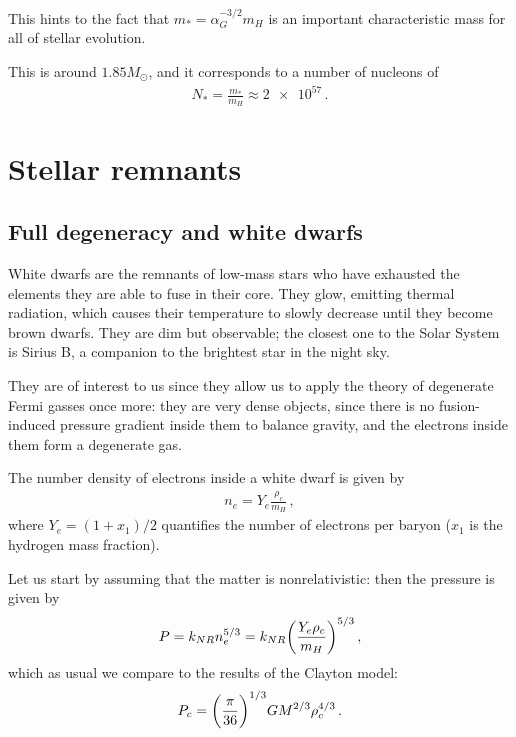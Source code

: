 \documentclass[main.tex]{subfiles}
\begin{document}
This hints to the fact that \(m_{*} = \alpha_{G}^{-3/2} m_H \) is an important characteristic mass for all of stellar evolution.

This is around \(\num{1.85} M_{\odot}\), and it corresponds to a number of nucleons of
%
\begin{align}
  N_{*} = \frac{m_{*}}{m_H} \approx \num{2e57}
\,.
\end{align}

\section{Stellar remnants}

\subsection{Full degeneracy and white dwarfs}

White dwarfs are the remnants of low-mass stars who have exhausted the elements they are able to fuse in their core. They glow, emitting thermal radiation, which causes their temperature to slowly decrease until they become brown dwarfs. 
They are dim but observable; the closest one to the Solar System is Sirius B, a companion to the brightest star in the night sky.

They are of interest to us since they allow us to apply the theory of degenerate Fermi gasses once more: they are very dense objects, since there is no fusion-induced pressure gradient inside them to balance gravity, and the electrons inside them form a degenerate gas.

The number density of electrons inside a white dwarf is given by
%
\begin{align}
  n_e = Y_{e} \frac{\rho_{c}}{m_H}
\,,
\end{align}
%
where \(Y_e = (1 + x_1) /2\) quantifies the number of electrons per baryon (\(x_1 \) is the hydrogen mass fraction).


Let us start by assuming that the matter is nonrelativistic: then  
the pressure is given by
%
\begin{align}
  P = k_{NR} n_e^{5/3} = k_{NR} \qty(\frac{Y_e \rho_{c}}{m_H})^{5/3}
\,,
\end{align}
%
which as usual we compare to the results of the Clayton model:
%
\begin{align}
  P_c = \qty(\frac{\pi }{36})^{1/3} G M^{2/3} \rho_{c}^{4/3}
\,.
\end{align}
\end{document}
